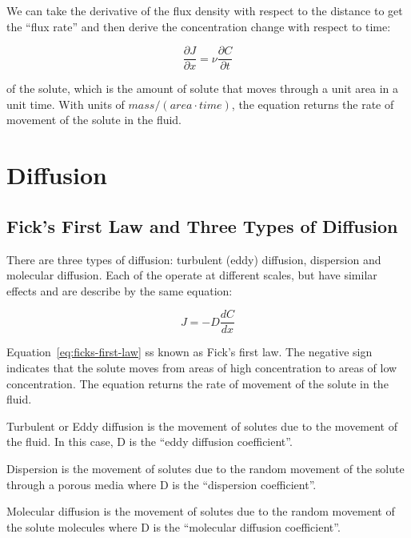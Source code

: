 \documentclass{tufte-handout}\usepackage[]{graphicx}\usepackage[]{xcolor}
\newenvironment{description*}%
  {\begin{description}%
    \setlength{\itemsep}{0pt}%
    \setlength{\parskip}{0pt}}%
  {\end{description}}
\begin{document}
We can take the derivative of the flux density with respect to the distance to get the ``flux rate'' and then derive the concentration change with respect to time: 

\begin{equation}
  \frac{\partial J}{\partial x} = \nu \frac{\partial C}{\partial t}
\end{equation}


of the solute, which is the amount of solute that moves through a unit area in a unit time. With units of $mass / (area \cdot time)$, the equation returns the rate of movement of the solute in the fluid.

\section{Diffusion}

\subsection{Fick's First Law and Three Types of Diffusion}

There are three types of diffusion: turbulent (eddy) diffusion, dispersion and molecular diffusion. Each of the operate at different scales, but have similar effects and are describe by the same equation:

\begin{equation}\label{eq:ficks-first-law}
  J = -D \frac{d C}{dx}
\end{equation}

Equation~\ref{eq:ficks-first-law} ss known as Fick's first law. The negative sign indicates that the solute moves from areas of high concentration to areas of low concentration. The equation returns the rate of movement of the solute in the fluid.

\begin{description*}

\item[Turbulent or Eddy diffusion] is the movement of solutes due to the movement of the fluid. In this case, D is the ``eddy diffusion coefficient''.

\item[Dispersion] is the movement of solutes due to the random movement of the solute through a porous media where D is the ``dispersion coefficient''.

\item[Molecular diffusion] is the movement of solutes due to the random movement of the solute molecules where D is the ``molecular diffusion coefficient''.

\end{description*}
\end{document}
